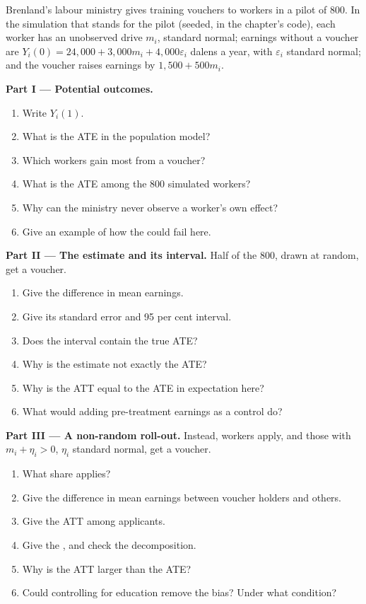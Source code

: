 \begin{problem}
\label{pb:b2:causality-and-experiments:1}
Brenland's labour ministry gives training vouchers to workers in a pilot of 800. In the simulation that stands for the
pilot (seeded, in the chapter's code), each worker has an unobserved drive $m_i$, standard normal; earnings without a
voucher are $Y_i(0) = 24{,}000 + 3{,}000m_i + 4{,}000\varepsilon_i$ dalens a year, with $\varepsilon_i$ standard normal; and
the voucher raises earnings by $1{,}500 + 500m_i$.

\medskip
\noindent\textbf{Part I --- Potential outcomes.}
\begin{enumerate}
  \item Write $Y_i(1)$.
  \item What is the ATE in the population model?
  \item Which workers gain most from a voucher?
  \item What is the ATE among the 800 simulated workers?
  \item Why can the ministry never observe a worker's own effect?
  \item Give an example of how the  could fail here.
\end{enumerate}

\medskip
\noindent\textbf{Part II --- The estimate and its interval.} Half of the 800, drawn at random, get a voucher.
\begin{enumerate}[resume]
  \item Give the difference in mean earnings.
  \item Give its standard error and 95 per cent interval.
  \item Does the interval contain the true ATE?
  \item Why is the estimate not exactly the ATE?
  \item Why is the ATT equal to the ATE in expectation here?
  \item What would adding pre-treatment earnings as a control do?
\end{enumerate}

\medskip
\noindent\textbf{Part III --- A non-random roll-out.} Instead, workers apply, and those with $m_i + \eta_i > 0$, $\eta_i$
standard normal, get a voucher.
\begin{enumerate}[resume]
  \item What share applies?
  \item Give the difference in mean earnings between voucher holders and others.
  \item Give the ATT among applicants.
  \item Give the , and check the decomposition.
  \item Why is the ATT larger than the ATE?
  \item Could controlling for education remove the bias? Under what condition?
\end{enumerate}


\end{problem}
